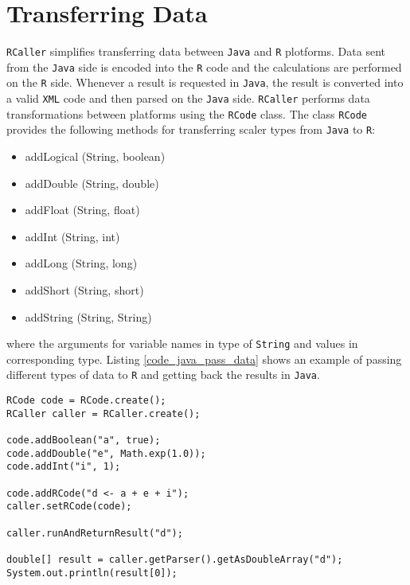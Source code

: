 \documentclass[10pt,a4paper, final, oneside]{article}
\begin{document}
\section{Transferring Data}
\label{sec:transferring_data}
\texttt{RCaller} simplifies transferring data between \texttt{Java} and \texttt{R} plotforms. Data sent from the \texttt{Java} side is encoded into the \texttt{R} code and the calculations are performed on the \texttt{R} side. Whenever a result is requested in \texttt{Java}, the result is converted into a valid \texttt{XML} code and then parsed on the \texttt{Java} side. \texttt{RCaller} performs data transformations between platforms using the \texttt{RCode} class. The class \texttt{RCode} provides the following methods for transferring scaler types from \texttt{Java} to \texttt{R}:

\begin{itemize}
\item addLogical (String, boolean)
\item addDouble (String, double)
\item addFloat (String, float)
\item addInt (String, int)
\item addLong (String, long)
\item addShort (String, short)
\item addString (String, String)
\end{itemize}

\noindent where the arguments for variable names in type of \texttt{String} and values in corresponding type. Listing \ref{code_java_pass_data} shows an example of passing different types of data to \texttt{R} and getting back the results in \texttt{Java}.

\begin{minipage}{\linewidth}
\begin{lstlisting}[caption=Passing Data,label=code_java_pass_data]
RCode code = RCode.create();
RCaller caller = RCaller.create();
        
code.addBoolean("a", true);
code.addDouble("e", Math.exp(1.0));
code.addInt("i", 1);
        
code.addRCode("d <- a + e + i");
caller.setRCode(code);
       
caller.runAndReturnResult("d");
        
double[] result = caller.getParser().getAsDoubleArray("d");
System.out.println(result[0]);
\end{lstlisting}
\end{minipage}
\end{document}
